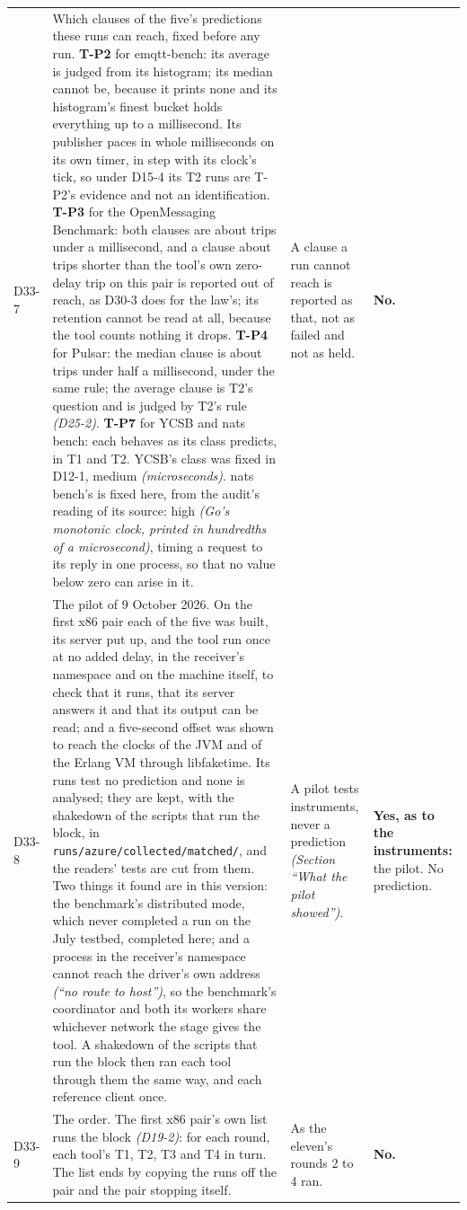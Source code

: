 \documentclass[11pt]{article}
\newcommand{\gl}[1]{{\color{soft}\itshape\small (#1)}}
\begin{document}
{\begin{longtable}{@{}p{1.1cm} >{\raggedright\arraybackslash}p{6.1cm} >{\raggedright\arraybackslash}p{6.0cm} >{\raggedright\arraybackslash}p{2.2cm}@{}}
D33-7 & Which clauses of the five's predictions these runs can reach, fixed before any run. \textbf{T-P2} for emqtt-bench: its average is judged from its histogram; its median cannot be, because it prints none and its histogram's finest bucket holds everything up to a millisecond. Its publisher paces in whole milliseconds on its own timer, in step with its clock's tick, so under D15-4 its T2 runs are T-P2's evidence and not an identification. \textbf{T-P3} for the OpenMessaging Benchmark: both clauses are about trips under a millisecond, and a clause about trips shorter than the tool's own zero-delay trip on this pair is reported out of reach, as D30-3 does for the law's; its retention cannot be read at all, because the tool counts nothing it drops. \textbf{T-P4} for Pulsar: the median clause is about trips under half a millisecond, under the same rule; the average clause is T2's question and is judged by T2's rule \gl{D25-2}. \textbf{T-P7} for YCSB and nats bench: each behaves as its class predicts, in T1 and T2. YCSB's class was fixed in D12-1, medium \gl{microseconds}. nats bench's is fixed here, from the audit's reading of its source: high \gl{Go's monotonic clock, printed in hundredths of a microsecond}, timing a request to its reply in one process, so that no value below zero can arise in it. & A clause a run cannot reach is reported as that, not as failed and not as held. & \textbf{No.} \\
D33-8 & The pilot of 9 October 2026. On the first x86 pair each of the five was built, its server put up, and the tool run once at no added delay, in the receiver's namespace and on the machine itself, to check that it runs, that its server answers it and that its output can be read; and a five-second offset was shown to reach the clocks of the JVM and of the Erlang VM through libfaketime. Its runs test no prediction and none is analysed; they are kept, with the shakedown of the scripts that run the block, in \texttt{runs/azure/collected/matched/}, and the readers' tests are cut from them. Two things it found are in this version: the benchmark's distributed mode, which never completed a run on the July testbed, completed here; and a process in the receiver's namespace cannot reach the driver's own address \gl{``no route to host''}, so the benchmark's coordinator and both its workers share whichever network the stage gives the tool. A shakedown of the scripts that run the block then ran each tool through them the same way, and each reference client once. & A pilot tests instruments, never a prediction \gl{Section ``What the pilot showed''}. & \textbf{Yes, as to the instruments:} the pilot. No prediction. \\
D33-9 & The order. The first x86 pair's own list runs the block \gl{D19-2}: for each round, each tool's T1, T2, T3 and T4 in turn. The list ends by copying the runs off the pair and the pair stopping itself. & As the eleven's rounds 2 to 4 ran. & \textbf{No.} \\
\bottomrule
\end{longtable}}
\end{document}
